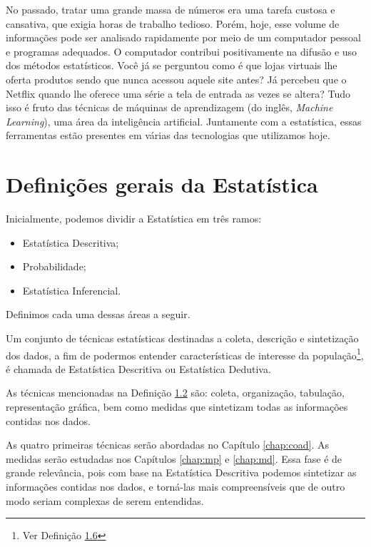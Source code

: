 \documentclass[
]{book}
\providecommand{\tightlist}{%
  \setlength{\itemsep}{0pt}\setlength{\parskip}{0pt}}
\begin{document}
No passado, tratar uma grande massa de números era uma tarefa custosa e cansativa, que exigia horas de trabalho tedioso. Porém, hoje, esse volume de informações pode ser analisado rapidamente por meio de um computador pessoal e programas adequados. O computador contribui positivamente na difusão e uso dos métodos estatísticos. Você já se perguntou como é que lojas virtuais lhe oferta produtos sendo que nunca acessou aquele site antes? Já percebeu que o Netflix quando lhe oferece uma série a tela de entrada as vezes se altera? Tudo isso é fruto das técnicas de máquinas de aprendizagem (do inglês, \emph{Machine Learning}), uma área da inteligência artificial. Juntamente com a estatística, essas ferramentas estão presentes em várias das tecnologias que utilizamos hoje.

\hypertarget{definiuxe7uxf5es-gerais-da-estatuxedstica}{%
\section{Definições gerais da Estatística}\label{definiuxe7uxf5es-gerais-da-estatuxedstica}}

Inicialmente, podemos dividir a Estatística em três ramos:

\begin{itemize}
\tightlist
\item
  Estatística Descritiva;
\item
  Probabilidade;
\item
  Estatística Inferencial.
\end{itemize}

Definimos cada uma dessas áreas a seguir.

\leavevmode\hypertarget{def:estdescritiva}{}%
Um conjunto de técnicas estatísticas destinadas a coleta, descrição e sintetização dos dados, a fim de podermos entender características de interesse da população\footnote{Ver Definição \protect\hyperlink{def:populacao}{1.6}}, é chamada de Estatística Descritiva ou Estatística Dedutiva.

As técnicas mencionadas na Definição \protect\hyperlink{def:estdescritiva}{1.2} são: coleta, organização, tabulação, representação gráfica, bem como medidas que sintetizam todas as informações contidas nos dados.

As quatro primeiras técnicas serão abordadas no Capítulo \ref{chap:coad}. As medidas serão estudadas nos Capítulos \ref{chap:mp} e \ref{chap:md}. Essa fase é de grande relevância, pois com base na Estatística Descritiva podemos sintetizar as informações contidas nos dados, e torná-las mais compreensíveis que de outro modo seriam complexas de serem entendidas.
\end{document}
